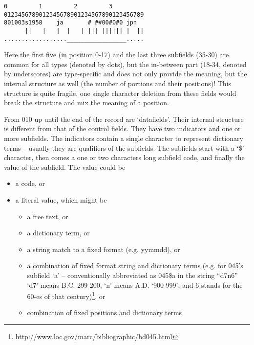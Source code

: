 \begin{verbatim}
0         1         2         3  
0123456789012345678901234567890123456789
801003s1958    ja       # ##00#0#0 jpn  
      ||   |   |  |   | ||| |||||| |  || 
.................._________________.....
\end{verbatim}

Here the first five (in position 0-17) and the last three subfields (35-30) are common for all types (denoted by dots), but the in-between part (18-34, denoted by underscores) are type-specific and does not only provide the meaning, but the internal structure as well (the number of portions and their positions)! This structure is quite fragile, one single character deletion from these fields would break the structure and mix the meaning of a position.

From 010 up until the end of the record are `datafields'. Their internal structure is different from that of the control fields. They have two indicators and one or more subfields. The indicators contain a single character to represent dictionary terms -- usually they are qualifiers of the subfields. The subfields start with a `\$' character, then comes a one or two characters 
long subfield code, and finally the value of the subfield. The value could be

\begin{itemize}
 \setlength{\parskip}{0pt}
 \setlength{\itemsep}{0pt plus 1pt}
 \item a code, or
 \item a literal value, which might be
 \begin{itemize}
  \setlength{\parskip}{0pt}
  \setlength{\itemsep}{0pt plus 1pt}
  \item a free text, or
  \item a dictionary term, or
  \item a string match to a fixed format (e.g. yymmdd), or
  \item a combination of fixed format string and dictionary terms (e.g. for 045's subfield `a' -- conventionally abbreviated as 045\$a in the string ``d7n6'' `d7' means B.C. 299-200, `n' means A.D. `900-999', and 6 stands for the 60-es of that century)\footnote{http://www.loc.gov/marc/bibliographic/bd045.html}, or
  \item combination of fixed positions and dictionary terms
 \end{itemize}
\end{itemize}

